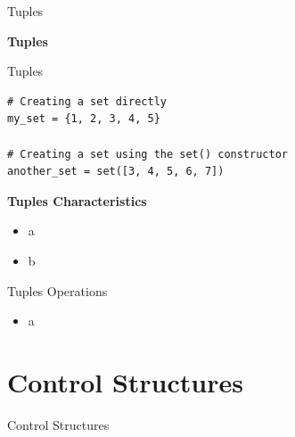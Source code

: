 \documentclass[
	11pt, 
]{beamer}
\begin{document}
\begin{frame}[fragile]{Tuples}
\scriptsize
    
\begin{block}{\textbf{Tuples}}

    Tuples

\end{block}
\begin{verbatim}
# Creating a set directly
my_set = {1, 2, 3, 4, 5}

# Creating a set using the set() constructor
another_set = set([3, 4, 5, 6, 7]) \end{verbatim}

\begin{exampleblock}{\textbf{Tuples Characteristics}}
    \begin{itemize}
        \item a
        \item b
    \end{itemize}    
\end{exampleblock}


\end{frame}




\begin{frame}[fragile]{Tuples Operations}
\scriptsize
\begin{itemize}
    \item a



    
\end{itemize}
\end{frame}


\section{Control Structures}
\begin{frame}{Control Structures}
\end{frame}


\end{document}
